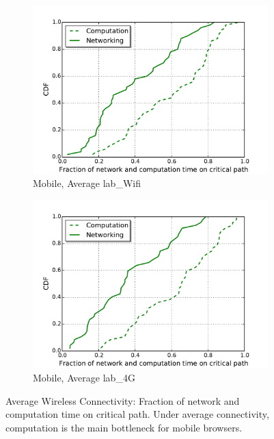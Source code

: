 \begin{figure}[!htb]
\begin{subfigure}{0.48\textwidth}
        \includegraphics[width=1\linewidth]{./figures/computation/mobile-b20-d50.pdf}
        \caption{Mobile, Average lab\_Wifi}
        \label{fig:mobile-b20-d50}
    \end{subfigure}%
    \begin{subfigure}{0.48\textwidth}
    \centering
        \includegraphics[width=1\linewidth]{./figures/computation/mobile-b5-d50.pdf}
        \caption{Mobile, Average lab\_4G}
        \label{fig:mobile-b5-d50}
    \end{subfigure}
      \caption{Average Wireless Connectivity: Fraction of network and computation time on critical path. Under average connectivity, computation is the main bottleneck for mobile browsers. }
    \label{fig:comp_net_fraction_average}
   \end{figure}
   
